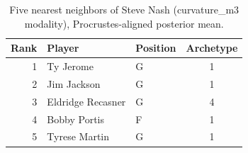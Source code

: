 \begin{table}[htbp]
  \centering\small
  \begin{tabular}{rllc}
    \toprule
    Rank & Player & Position & Archetype \\
    \midrule
    1 & Ty Jerome & G & 1 \\
    2 & Jim Jackson & G & 1 \\
    3 & Eldridge Recasner & G & 4 \\
    4 & Bobby Portis & F & 1 \\
    5 & Tyrese Martin & G & 1 \\
    \bottomrule
  \end{tabular}
  \caption{Five nearest neighbors of Steve Nash (curvature_m3 modality), Procrustes-aligned posterior mean.}
  \label{tab:Steve_Nash_neighbors_curvature_m3}
\end{table}

